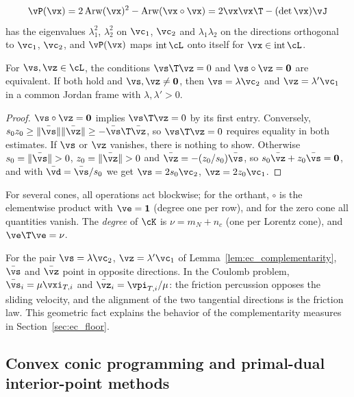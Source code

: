%
\begin{equation}\label{eq:ec_quad_rep}
	\vP(\vx) = 2\operatorname{Arw}(\vx)^2 - \operatorname{Arw}(\vx \circ \vx) = 2\vx\vx\T - (\det\vx)\vJ
\end{equation}
%
has the eigenvalues $\lambda_1^2$, $\lambda_2^2$ on $\vc_1$, $\vc_2$ and $\lambda_1\lambda_2$ on the directions orthogonal to $\vc_1$, $\vc_2$, and $\vP(\vx)$ maps $\operatorname{int}\cL$ onto itself for $\vx \in \operatorname{int}\cL$.
%
\begin{lemma}\label{lem:ec_complementarity}
	For $\vs, \vz \in \cL$, the conditions $\vs\T\vz = 0$ and $\vs \circ \vz = \mathbf{0}$ are equivalent. If both hold and $\vs, \vz \neq \mathbf{0}$, then $\vs = \lambda\vc_2$ and $\vz = \lambda'\vc_1$ in a common Jordan frame with $\lambda, \lambda' > 0$.
\end{lemma}
%
\begin{proof}
	$\vs\circ\vz = \mathbf{0}$ implies $\vs\T\vz = 0$ by its first entry. Conversely, $s_0 z_0 \geq \|\bar{\vs}\|\|\bar{\vz}\| \geq -\bar{\vs}\T\bar{\vz}$, so $\vs\T\vz = 0$ requires equality in both estimates. If $\vs$ or $\vz$ vanishes, there is nothing to show. Otherwise $s_0 = \|\bar{\vs}\| > 0$, $z_0 = \|\bar{\vz}\| > 0$ and $\bar{\vz} = -(z_0/s_0)\bar{\vs}$, so $s_0\bar{\vz} + z_0\bar{\vs} = \mathbf{0}$, and with $\bar{\vd} = \bar{\vs}/s_0$ we get $\vs = 2s_0\vc_2$, $\vz = 2z_0\vc_1$.
\end{proof}
%
For several cones, all operations act blockwise; for the orthant, $\circ$ is the elementwise product with $\ve = \mathbf{1}$ (degree one per row), and for the zero cone all quantities vanish. The \emph{degree} of $\cK$ is $\nu = m_N + n_c$ (one per Lorentz cone), and $\ve\T\ve = \nu$.

For the pair $\vs = \lambda\vc_2$, $\vz = \lambda'\vc_1$ of Lemma~\ref{lem:ec_complementarity}, $\bar{\vs}$ and $\bar{\vz}$ point in opposite directions. In the Coulomb problem, $\bar{\vs}_i = \mu\vxi_{T,i}$ and $\bar{\vz}_i = \vpi_{T,i}/\mu$: the friction percussion opposes the sliding velocity, and the alignment of the two tangential directions is the friction law. This geometric fact explains the behavior of the complementarity measures in Section~\ref{sec:ec_floor}.
%
\subsection{Convex conic programming and primal-dual interior-point methods}\label{sec:ec_ipm}
%
